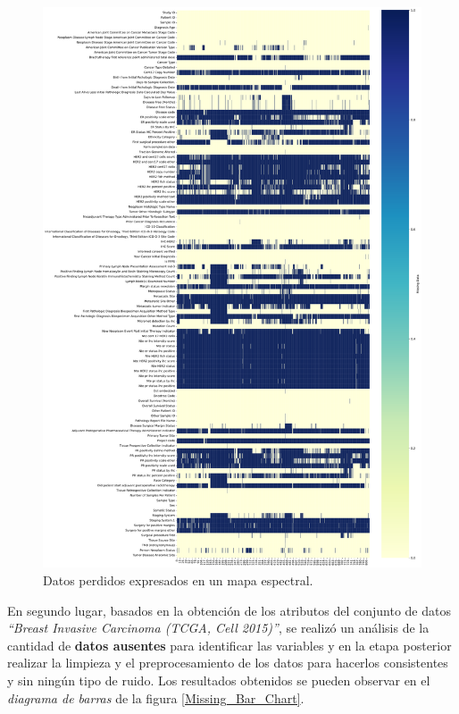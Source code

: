 \begin{figure}[!htb]
	\centering
	\includegraphics[width=1
	\linewidth]{NOTEBOOK/IMAGENES_PERDIDAS/missing_heatmap}
	\caption{Datos perdidos expresados en un mapa espectral.}
	\label{Missing_Spectrum}
\end{figure}


\clearpage
En segundo lugar, basados en la obtención de los atributos del conjunto de datos \textit{“Breast Invasive Carcinoma (TCGA, Cell 2015)”}, se realizó un análisis de la cantidad de \textbf{datos ausentes} para identificar las variables y en la etapa posterior realizar la limpieza y el preprocesamiento de los datos para hacerlos consistentes y sin ningún tipo de ruido. Los resultados obtenidos se pueden observar en el \textit{diagrama de barras} de la figura \ref{Missing_Bar_Chart}. 

